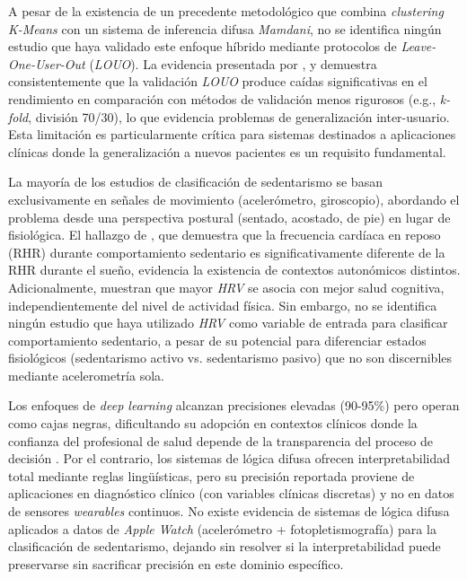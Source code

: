 A pesar de la existencia de un precedente metodológico \cite{Goncalves2021} que combina \textit{clustering} \textit{K-Means} con un sistema de inferencia difusa \textit{Mamdani}, no se identifica ningún estudio que haya validado este enfoque híbrido mediante protocolos de \textit{Leave-One-User-Out} (\textit{LOUO}). La evidencia presentada por \cite{Rehman2024LOSO}, \cite{Mathew2024LOSO} y \cite{Bassani2025DLHAR} demuestra consistentemente que la validación \textit{LOUO} produce caídas significativas en el rendimiento en comparación con métodos de validación menos rigurosos (e.g., \textit{k-fold}, división 70/30), lo que evidencia problemas de generalización inter-usuario. Esta limitación es particularmente crítica para sistemas destinados a aplicaciones clínicas donde la generalización a nuevos pacientes es un requisito fundamental.

La mayoría de los estudios de clasificación de sedentarismo se basan exclusivamente en señales de movimiento (acelerómetro, giroscopio), abordando el problema desde una perspectiva postural (sentado, acostado, de pie) en lugar de fisiológica. El hallazgo de \cite{Godkin2025Context}, que demuestra que la frecuencia cardíaca en reposo (RHR) durante comportamiento sedentario es significativamente diferente de la RHR durante el sueño, evidencia la existencia de contextos autonómicos distintos. Adicionalmente, \cite{Marino2024ARIC} muestran que mayor \textit{HRV} se asocia con mejor salud cognitiva, independientemente del nivel de actividad física. Sin embargo, no se identifica ningún estudio que haya utilizado \textit{HRV} como variable de entrada para clasificar comportamiento sedentario, a pesar de su potencial para diferenciar estados fisiológicos (sedentarismo activo vs. sedentarismo pasivo) que no son discernibles mediante acelerometría sola.

Los enfoques de \textit{deep learning} \cite{Khan2024Wearable, Bassani2025DLHAR} alcanzan precisiones elevadas (90-95\%) pero operan como cajas negras, dificultando su adopción en contextos clínicos donde la confianza del profesional de salud depende de la transparencia del proceso de decisión \cite{Bienefeld2023XAI}. Por el contrario, los sistemas de lógica difusa \cite{Capitoli2025FuzzyXAI, MarashiHosseini2023Dietary} ofrecen interpretabilidad total mediante reglas lingüísticas, pero su precisión reportada proviene de aplicaciones en diagnóstico clínico (con variables clínicas discretas) y no en datos de sensores \textit{wearables} continuos. No existe evidencia de sistemas de lógica difusa aplicados a datos de \textit{Apple Watch} (acelerómetro + fotopletismografía) para la clasificación de sedentarismo, dejando sin resolver si la interpretabilidad puede preservarse sin sacrificar precisión en este dominio específico.

